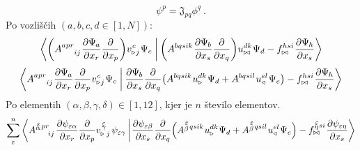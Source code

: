 \begin{equation}
   \psi^p = \mathfrak{J}_{pq} \phi^{q} \ .
   \label{eq:refToEmt}
\end{equation}
Po vozliščih $(a, b, c, d \in [1,N])$:
\begin{equation}
   \braket{
      \qty(A^{a p r}_{\mkern28mu i j} \mkern1mu
      \pdv{\Psi_{\mkern-1mu a}}{x_r} \pdv{}{x_p})
      v^{\mkern1mu c}_{\triangleright \mkern1mu j} \mkern1mu \Psi_c \mkern5mu  }
   {
      \mkern4mu \qty(A^{b q s i k} \mkern1mu
      \pdv{\Psi_{\mkern-1mu b}}{x_s} \pdv{}{x_q} )
      u^{d k}_{\bowtie} \mkern1mu \Psi_d
      -
      f^{h s i}_{\bowtie} \mkern1mu \pdv{\Psi_{\mkern-1mu h}}{x_s} }
\end{equation}
\begin{equation}
   \braket{
      A^{a p r}_{\mkern28mu i j} \mkern1mu
      \pdv{\Psi_{\mkern-1mu a}}{x_r} \pdv{}{x_p}
      v^{\mkern1mu c}_{\triangleright \mkern1mu j} \mkern1mu \Psi_c \mkern5mu  }
   {
         \mkern4mu
      \pdv{\Psi_{\mkern-1mu b}}{x_s}
      \pdv{}{x_q}
         \qty(
      A^{b q s i k} \mkern1mu
      u^{d k}_\triangleright \mkern1mu \Psi_d
      +
      A^{b q s i l} \mkern1mu
      u^{e l}_\triangleleft \mkern1mu \Psi_e )
      -
      f^{h s i}_{\bowtie} \mkern1mu \pdv{\Psi_{\mkern-1mu h}}{x_s} }
\end{equation}
Po elementih $(\alpha, \beta, \gamma, \delta) \in [1,12]$, kjer je $n$ število elementov.
\begin{equation}
   \sum^n_{\varepsilon}
   \braket{
      A^{\substack{\mkern2mu \varepsilon \\[-0.65mm] \alpha} \mkern2mu p r}_{\mkern29mu i j} \mkern2mu
      \pdv{\psi_{ \varepsilon \alpha}}{x_r} \pdv{}{x_p}
      v^{\mkern 2mu \substack{\varepsilon \\[-0.65mm] \gamma \\[-0.2mm]}}_{\triangleright \mkern5mu j} \mkern2mu
      \psi_{\varepsilon \gamma} \mkern3mu }
   {
         \mkern2mu
      \pdv{\psi_{\varepsilon \beta}}{x_s}
      \frac{\partial}{\partial x_q}
         \qty(
      A^{\substack{\mkern2mu \varepsilon \\[0.05mm] \beta} \mkern2mu q s i k} \mkern1mu
      u^{d k}_\triangleright \mkern1mu \Psi_d
      +
      A^{\substack{\mkern2mu \varepsilon \\[0.05mm] \beta} \mkern2mu q s i l} \mkern1mu
      u^{e l}_\triangleleft \mkern1mu \Psi_e
         ) -
      f^{\substack{\mkern2mu \varepsilon \\[-0.59mm] \eta} \mkern1mu s i}_{\bowtie} \mkern1mu
      \pdv{\psi_{\varepsilon \eta}}{x_s}}
\end{equation}
